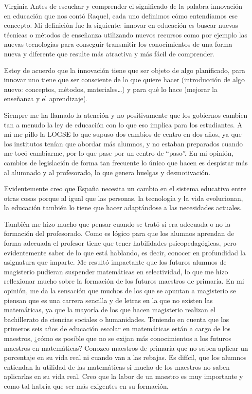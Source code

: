 \begin{opin}{\virgicolor}{Virginia}
Antes de escuchar y comprender el significado de la palabra innovación en educación que nos contó Raquel, cada uno definimos cómo entendíamos ese concepto. Mi definición fue la siguiente: innovar en educación es buscar nuevas técnicas o métodos de enseñanza utilizando nuevos recursos como por ejemplo las nuevas tecnologías para conseguir transmitir los conocimientos de una forma nueva y diferente que resulte más atractiva y más fácil de comprender.

Estoy de acuerdo que la innovación tiene que ser objeto de algo planificado, para innovar uno tiene que ser consciente de lo que quiere hacer (introducción de algo nuevo: conceptos, métodos, materiales…) y para qué lo hace (mejorar la enseñanza y el aprendizaje).

Siempre me ha llamado la atención y no positivamente que los gobiernos cambien tan a menudo la ley de educación con lo que eso implica para los estudiantes. A mí me pillo la LOGSE lo que supuso dos cambios de centro en dos años, ya que los institutos tenían que abordar más alumnos, y no estaban preparados cuando me tocó cambiarme, por lo que pase por un centro de “paso”. En mi opinión, cambios de legislación de forma tan frecuente lo único que hacen es despistar más al alumnado y al profesorado, lo que genera huelgas y desmotivación.

Evidentemente creo que España necesita un cambio en el sistema educativo entre otras cosas porque al igual que las personas, la tecnología y la vida evolucionan, la educación también lo tiene que hacer adaptándose a las necesidades actuales.

También me hizo mucho que pensar cuando se trató si era adecuada o no la formación del profesorado. Como es lógico para que los alumnos aprendan de forma adecuada el profesor tiene que tener habilidades psicopedagógicas, pero evidentemente saber de lo que está hablando, es decir, conocer en profundidad la asignatura que imparte. Me resultó impactante que los futuros alumnos de magisterio pudieran suspender matemáticas en selectividad, lo que me hizo reflexionar mucho sobre la formación de los futuros maestros de primaria. En mi opinión, me da la sensación que muchos de los que se apuntan a magisterio se piensan que es una carrera sencilla y de letras en la que no existen las matemáticas, ya que la mayoría de los que hacen magisterio realizan el bachillerato de ciencias sociales o humanidades. Teniendo en cuenta que los primeros seis años de educación escolar en matemáticas están a cargo de los maestros, ¿cómo es posible que no se exijan más conocimientos a los futuros maestros en matemáticas? Conozco maestros de primaria que no saben aplicar un porcentaje en su vida real ni cuando van a las rebajas. Es difícil, que los alumnos entiendan la utilidad de las matemáticas si mucho de los maestros no saben aplicarlas en su vida real. Creo que la labor de un maestro es muy importante y como tal habría que ser más exigentes en su formación.


\end{opin}
